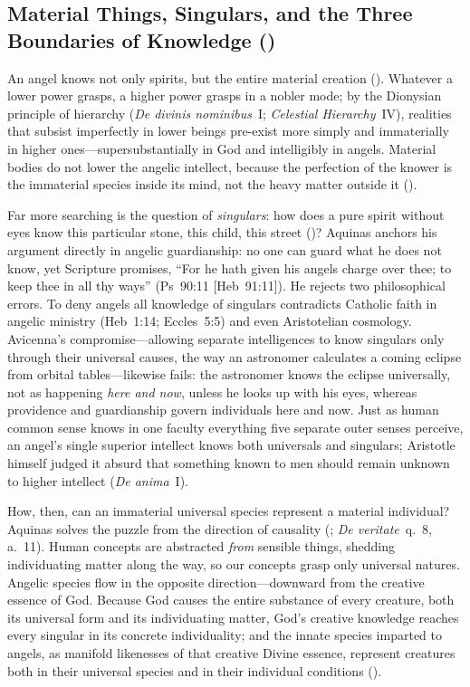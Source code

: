 \subsection{Material Things, Singulars, and the Three Boundaries of Knowledge ()}

An angel knows not only spirits, but the entire material creation (). Whatever a lower power grasps, a higher power grasps in a nobler mode; by the Dionysian principle of hierarchy (\emph{De divinis nominibus}~I; \emph{Celestial Hierarchy}~IV), realities that subsist imperfectly in lower beings pre-exist more simply and immaterially in higher ones---supersubstantially in God and intelligibly in angels. Material bodies do not lower the angelic intellect, because the perfection of the knower is the immaterial species inside its mind, not the heavy matter outside it ().

Far more searching is the question of \emph{singulars}: how does a pure spirit without eyes know this particular stone, this child, this street ()? Aquinas anchors his argument directly in angelic guardianship: no one can guard what he does not know, yet Scripture promises, ``For he hath given his angels charge over thee; to keep thee in all thy ways'' (Ps~90:11 [Heb~91:11]). He rejects two philosophical errors. To deny angels all knowledge of singulars contradicts Catholic faith in angelic ministry (Heb~1:14; Eccles~5:5) and even Aristotelian cosmology. Avicenna's compromise---allowing separate intelligences to know singulars only through their universal causes, the way an astronomer calculates a coming eclipse from orbital tables---likewise fails: the astronomer knows the eclipse universally, not as happening \emph{here and now}, unless he looks up with his eyes, whereas providence and guardianship govern individuals here and now. Just as human common sense knows in one faculty everything five separate outer senses perceive, an angel's single superior intellect knows both universals and singulars; Aristotle himself judged it absurd that something known to men should remain unknown to higher intellect (\emph{De anima}~I).

How, then, can an immaterial universal species represent a material individual? Aquinas solves the puzzle from the direction of causality (; \emph{De veritate}~q.~8, a.~11). Human concepts are abstracted \emph{from} sensible things, shedding individuating matter along the way, so our concepts grasp only universal natures. Angelic species flow in the opposite direction---downward from the creative essence of God. Because God causes the entire substance of every creature, both its universal form and its individuating matter, God's creative knowledge reaches every singular in its concrete individuality; and the innate species imparted to angels, as manifold likenesses of that creative Divine essence, represent creatures both in their universal species and in their individual conditions ().

